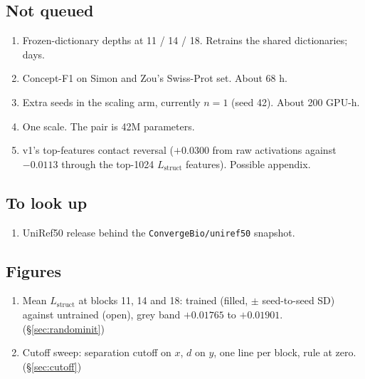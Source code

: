 \documentclass{article} %
\newcommand{\Lstruct}{\ensuremath{L_{\mathrm{struct}}}}
\begin{document}
\subsection{Not queued}

\begin{enumerate}[label=N\arabic*., ref=N\arabic*, leftmargin=2.6em]
\item \label{t:frozendepths} Frozen-dictionary depths at 11 / 14 / 18. Retrains the shared
dictionaries; days.
\item \label{t:conceptswissprot} Concept-F1 on Simon and Zou's Swiss-Prot set. About 68 h.
\item \label{t:scaleseeds} Extra seeds in the scaling arm, currently $n = 1$ (seed 42). About
200 GPU-h.
\item \label{n:onescale} One scale. The pair is 42M parameters.
\item v1's top-features contact reversal ($+0.0300$ from raw activations against $-0.0113$
through the top-1024 \Lstruct{} features). Possible appendix.
\end{enumerate}

\subsection{To look up}

\begin{enumerate}[label=L\arabic*., ref=L\arabic*, leftmargin=2.6em]
\item \label{f:uniref} UniRef50 release behind the \texttt{ConvergeBio/uniref50} snapshot.
\end{enumerate}

\subsection{Figures}

\begin{enumerate}[label=FIG\arabic*., ref=FIG\arabic*, leftmargin=2.6em]
\item \label{fig:one} Mean \Lstruct{} at blocks 11, 14 and 18: trained (filled, $\pm$ seed-to-seed
SD) against untrained (open), grey band $+0.01765$ to $+0.01901$. (\S\ref{sec:randominit})
\item \label{fig:two} Cutoff sweep: separation cutoff on $x$, $d$ on $y$, one line per block,
rule at zero. (\S\ref{sec:cutoff})
\end{enumerate}

\fi
\end{document}
